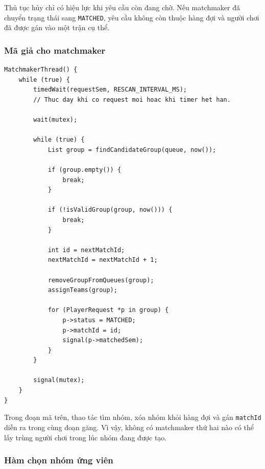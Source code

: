 Thủ tục hủy chỉ có hiệu lực khi yêu cầu còn đang chờ. Nếu matchmaker đã chuyển
trạng thái sang \texttt{MATCHED}, yêu cầu không còn thuộc hàng đợi và người chơi
đã được gán vào một trận cụ thể.

\subsubsection*{Mã giả cho matchmaker}

\begin{lstlisting}
MatchmakerThread() {
    while (true) {
        timedWait(requestSem, RESCAN_INTERVAL_MS);
        // Thuc day khi co request moi hoac khi timer het han.

        wait(mutex);

        while (true) {
            List group = findCandidateGroup(queue, now());

            if (group.empty()) {
                break;
            }

            if (!isValidGroup(group, now())) {
                break;
            }

            int id = nextMatchId;
            nextMatchId = nextMatchId + 1;

            removeGroupFromQueues(group);
            assignTeams(group);

            for (PlayerRequest *p in group) {
                p->status = MATCHED;
                p->matchId = id;
                signal(p->matchedSem);
            }
        }

        signal(mutex);
    }
}
\end{lstlisting}

Trong đoạn mã trên, thao tác tìm nhóm, xóa nhóm khỏi hàng đợi và gán
\texttt{matchId} diễn ra trong cùng đoạn găng. Vì vậy, không có matchmaker thứ
hai nào có thể lấy trùng người chơi trong lúc nhóm đang được tạo.

\subsubsection*{Hàm chọn nhóm ứng viên}

